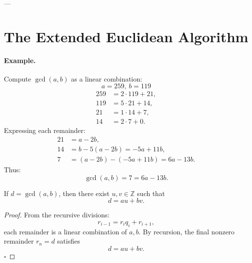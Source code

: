 ---

\section{The Extended Euclidean Algorithm}

\paragraph{Example.}
Compute \(\gcd(a,b)\) as a linear combination:
\[
a=259,\ b=119
\]
\[
\begin{aligned}
259 &= 2\cdot119 + 21,\\
119 &= 5\cdot21 + 14,\\
21  &= 1\cdot14 + 7,\\
14  &= 2\cdot7 + 0.
\end{aligned}
\]
Expressing each remainder:
\[
\begin{aligned}
21 &= a - 2b,\\
14 &= b - 5(a-2b) = -5a + 11b,\\
7  &= (a-2b) - (-5a+11b) = 6a - 13b.
\end{aligned}
\]
Thus:
\[
\boxed{\gcd(a,b)=7=6a-13b.}
\]

\begin{proposition}
If \(d=\gcd(a,b)\), then there exist \(u,v\in\mathbb{Z}\) such that
\[
\boxed{d=au+bv.}
\]
\end{proposition}

\begin{proof}
From the recursive divisions:
\[
r_{i-1}=r_i q_i + r_{i+1},
\]
each remainder is a linear combination of \(a,b\).  
By recursion, the final nonzero remainder \(r_n=d\) satisfies
\[
d = a u + b v.
\]
\hfill\(\square\)
\end{proof}
